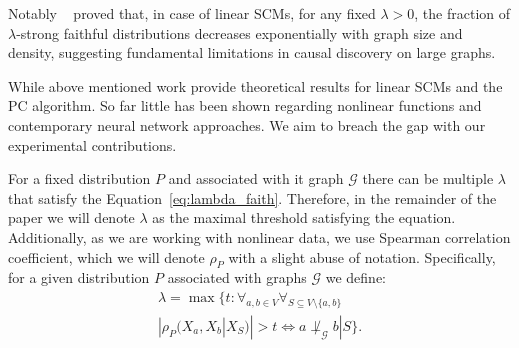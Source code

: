 
Notably ~\citep{geometry_of_faithfulness} proved that, in case of linear SCMs, for any fixed $\lambda > 0$, the fraction of $\lambda$-strong faithful distributions decreases exponentially with graph size and density, suggesting fundamental limitations in causal discovery on large graphs.  

While above mentioned work provide theoretical results for linear SCMs and the PC algorithm. So far little has been shown regarding nonlinear functions and contemporary neural network approaches. We aim to breach the gap with our experimental contributions.

For a fixed distribution $P$ and associated with it graph $\mathcal{G}$ there can be multiple $\lambda$ that satisfy the Equation~\ref{eq:lambda_faith}. Therefore, in the remainder of the paper we will denote $\lambda$ as the maximal threshold satisfying the equation. Additionally, as we are working with nonlinear data, we use Spearman correlation coefficient, which we will denote $\rho_P$ with a slight abuse of notation. Specifically, for a given distribution $P$ associated with graphs $\mathcal{G}$ we define:
\begin{multline}\label{eq:lambda_def}
    \lambda = \max\{t: \forall_{a,b \in V} \forall_{S \subseteq V \setminus \{a ,b\}} \\ |\rho_P(X_a, X_b | X_S)| > t \iff a \not\perp_\mathcal{G} b | S\}.
\end{multline}



